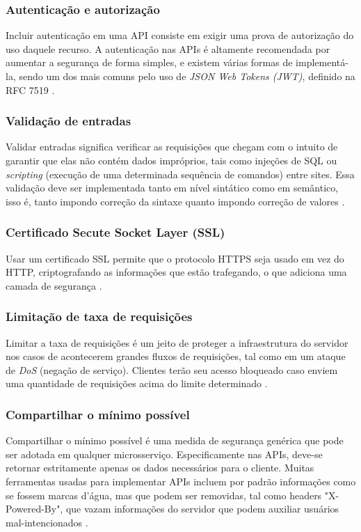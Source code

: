 \subsubsection*{Autenticação e autorização}

Incluir autenticação em uma API consiste em exigir uma prova de autorização do uso daquele recurso. A autenticação nas APIs é altamente recomendada por aumentar a segurança de forma simples, e existem várias formas de implementá-la, sendo um dos mais comuns pelo uso de \emph{JSON Web Tokens (JWT)}, definido na RFC 7519 \cite{rfc_http_nielsen_1999}.

\subsubsection*{Validação de entradas}

Validar entradas significa verificar as requisições que chegam com o intuito de garantir que elas não contém dados impróprios, tais como injeções de SQL ou \emph{scripting} (execução de uma determinada sequência de comandos) entre sites. Essa validação deve ser implementada tanto em nível sintático como em semântico, isso é, tanto impondo correção da sintaxe quanto impondo correção de valores \cite{rapidAPI-twitter}.

\subsubsection*{Certificado Secute Socket Layer (SSL)}
Usar um certificado SSL permite que o protocolo HTTPS seja usado em vez do HTTP, criptografando as informações que estão trafegando, o que adiciona uma camada de segurança \cite{rapidAPI-twitter}.

\subsubsection*{Limitação de taxa de requisições}
Limitar a taxa de requisições é um jeito de proteger a infraestrutura do servidor nos casos de acontecerem grandes fluxos de requisições, tal como em um ataque de \emph{DoS} (negação de serviço). Clientes terão seu acesso bloqueado caso enviem uma quantidade de requisições acima do limite determinado \cite{rapidAPI-twitter}.

\subsubsection*{Compartilhar o mínimo possível}
Compartilhar o mínimo possível é uma medida de segurança genérica que pode ser adotada em qualquer microsserviço. Especificamente nas APIs, deve-se retornar estritamente apenas os dados necessários para o cliente. Muitas ferramentas usadas para implementar APIs incluem por padrão informações como se fossem marcas d'água, mas que podem ser removidas, tal como headers "X-Powered-By", que vazam informações do servidor que podem auxiliar usuários mal-intencionados \cite{rapidAPI-twitter}.


